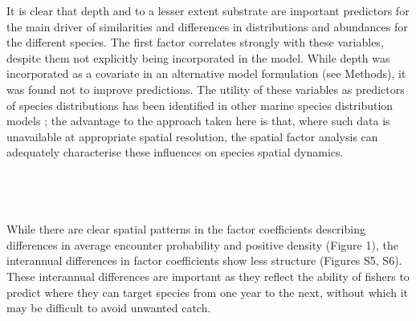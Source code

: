 \documentclass[fleqn,10pt]{wlscirep}
\begin{document}
\begin{linenumbers}
It is clear that depth and to a lesser extent substrate are important
predictors for the main driver of similarities and differences in distributions
and abundances for the different species. The first factor correlates
strongly with these variables, despite them not explicitly being incorporated
in the model. While depth was incorporated as a covariate in an alternative
model formulation (see Methods), it was found not to improve predictions. The
utility of these variables as predictors of species distributions has been
identified in other marine species distribution models \cite{Robinson2011}; the
advantage to the approach taken here is that, where such data is unavailable at
appropriate spatial resolution, the spatial factor analysis can adequately
characterise these influences on species spatial dynamics.\\

\subsection*{\\} 
While there are clear spatial patterns in the factor coefficients describing
differences in average  encounter probability and
positive density (Figure 1), the interannual differences in factor coefficients
show less structure (Figures S5, S6). These interannual differences are
important as they reflect the ability of fishers to predict where they can
target  species from one year to the next, without which
it may be difficult to 
avoid unwanted catch.\\


\end{linenumbers}
\end{document}
